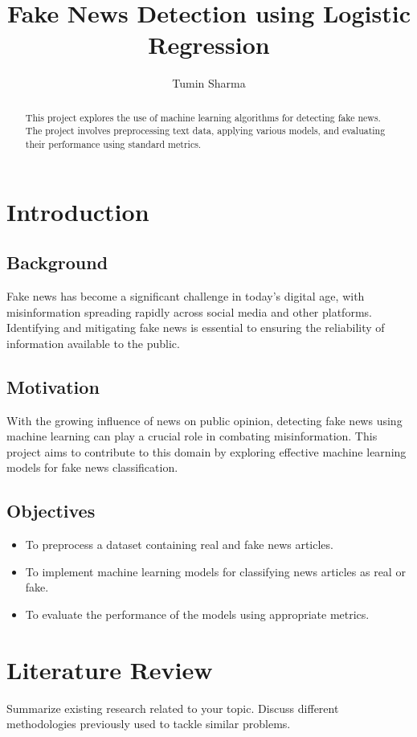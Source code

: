 \documentclass[12pt]{article}
\title{Fake News Detection using Logistic Regression}
\author{Tumin Sharma}
\begin{document}
\maketitle

\begin{abstract}
This project explores the use of machine learning algorithms for detecting fake news. The project involves preprocessing text data, applying various models, and evaluating their performance using standard metrics.
\end{abstract}

\tableofcontents

\section{Introduction}
\subsection{Background}
Fake news has become a significant challenge in today's digital age, with misinformation spreading rapidly across social media and other platforms. Identifying and mitigating fake news is essential to ensuring the reliability of information available to the public.  

\subsection{Motivation}
With the growing influence of news on public opinion, detecting fake news using machine learning can play a crucial role in combating misinformation. This project aims to contribute to this domain by exploring effective machine learning models for fake news classification.

\subsection{Objectives}
\begin{itemize}
    \item To preprocess a dataset containing real and fake news articles.
    \item To implement machine learning models for classifying news articles as real or fake. 
    \item To evaluate the performance of the models using appropriate metrics.
\end{itemize}

\section{Literature Review}
Summarize existing research related to your topic. Discuss different methodologies previously used to tackle similar problems.
\end{document}
